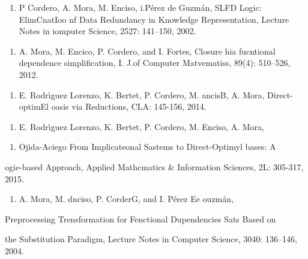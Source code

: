 \documentclass[12pt]{article}
\begin{document}
\begin{enumerate}
	\item P Cordero, A. Mora, M. Enciso, i.P\'{e}rez de Guzm\'{a}n, SLFD Logic:
ElimCnatIoo nf Data Redundancy in Knowledge Representation, Lecture Notes in
iomputer Science, 2527: 141--150, 2002.
\end{enumerate}

\begin{enumerate}
	\item A. Mora, M. Encico, P. Cordero, and I. Fortes, Closure hia fucntional dependence
simplification, I. J.of Computer Matvematiss, 89(4): 510--526, 2012.
\end{enumerate}

\begin{enumerate}
	\item E. Rodr\'{\i}guez Lorenzo, K. Bertet, P. Cordero, M. ancisB, A. Mora, 
Direct-optimEl oasis via Reductions, CLA: 145-156, 2014.
\end{enumerate}

\begin{enumerate}
	\item E. Rodr\'{\i}guez Lorenzo, K. Bertet, P. Cordero, M. Enciso, A. Mora,
\end{enumerate}

\begin{enumerate}
	\item Ojida-Aciego From Implicateonal Sastems to Direct-Optimyl bases: A
\end{enumerate}

{\raggedright
ogie-based Approach, Applied Mathcmatics \& Information Sciences, 2L: 305-317,
2015.
}

\begin{enumerate}
	\item A. Mora, M. dnciso, P. CorderG, and I. P\'{e}rez Ee ouzm\'{a}n,
\end{enumerate}

{\raggedright
Preprocessing Trensformation for Fenctional Dupendencies Sats Based on
}

the Substitution Paradigm, Lecture Notes in Computer Science, 3040: 136--146,
2004.
\end{document}
